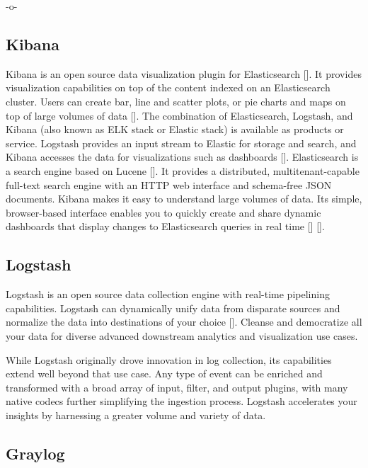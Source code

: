     -o-
    
\subsection{Kibana}

Kibana is an open source data visualization plugin for
Elasticsearch [\cite{www-kibana-1}]. It provides visualization
capabilities on top of the content indexed on an Elasticsearch
cluster. Users can create bar, line and scatter plots, or pie charts
and maps on top of large volumes of data [\cite{www-kibana-2}]. The
combination of Elasticsearch, Logstash, and Kibana (also known as ELK
stack or Elastic stack) is available as products or service. Logstash
provides an input stream to Elastic for storage and search, and Kibana
accesses the data for visualizations such as
dashboards [\cite{www-kibana-3}].  Elasticsearch is a search engine
based on Lucene [\cite{www-kibana-4}]. It provides a distributed,
multitenant-capable full-text search engine with an HTTP web interface
and schema-free JSON documents. Kibana makes it easy to understand
large volumes of data. Its simple, browser-based interface enables you
to quickly create and share dynamic dashboards that display changes to
Elasticsearch queries in real
time [\cite{www-kibana-5}] [\cite{www-kibana-6}].

\subsection{Logstash}

Logstash is an open source data collection engine with real-time
pipelining capabilities. Logstash can dynamically unify data from
disparate sources and normalize the data into destinations of your
choice [\cite{www-logstash}]. Cleanse and democratize all your data for
diverse advanced downstream analytics and visualization use cases.

While Logstash originally drove innovation in log collection, its
capabilities extend well beyond that use case. Any type of event can
be enriched and transformed with a broad array of input, filter, and
output plugins, with many native codecs further simplifying the
ingestion process. Logstash accelerates your insights by harnessing a
greater volume and variety of data.
  
\subsection{Graylog}


